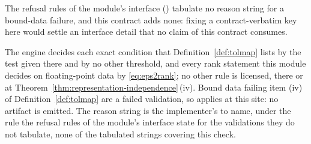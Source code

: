 
The refusal rules of the module's interface
() tabulate no reason string
for a bound-data failure, and this
contract adds none: fixing a contract-verbatim key here would settle an
interface detail that no claim of this contract consumes.

\begin{requirement}\label{req:tolerance-tests}
The engine decides each exact condition that Definition~\ref{def:tolmap} lists
by the test given there and by no other threshold, and every rank statement
this module decides on floating-point data by \eqref{eq:eps2rank}; no other
rule is licensed, there or at Theorem~\ref{thm:representation-independence}\,(iv). Bound data failing
item (iv) of Definition~\ref{def:tolmap} are a failed validation, so
 applies at this site: no artifact is emitted. The reason
string is the implementer's to name, under the rule the refusal rules of the
module's interface state for the validations they do not tabulate, none of
the tabulated strings
covering this check.
\end{requirement}

